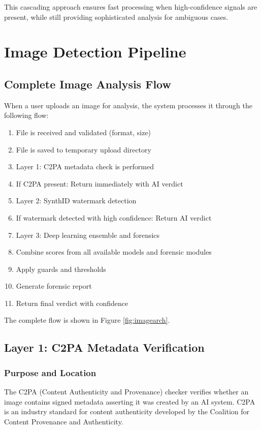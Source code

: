 \documentclass[12pt,a4paper]{book}
\begin{document}
This cascading approach ensures fast processing when high-confidence signals are present, while still providing sophisticated analysis for ambiguous cases.

\chapter{Image Detection Pipeline}
\label{ch:image-detection}

\section{Complete Image Analysis Flow}

When a user uploads an image for analysis, the system processes it through the following flow:

\begin{enumerate}
    \item File is received and validated (format, size)
    \item File is saved to temporary upload directory
    \item Layer 1: C2PA metadata check is performed
    \item If C2PA present: Return immediately with AI verdict
    \item Layer 2: SynthID watermark detection
    \item If watermark detected with high confidence: Return AI verdict
    \item Layer 3: Deep learning ensemble and forensics
    \item Combine scores from all available models and forensic modules
    \item Apply guards and thresholds
    \item Generate forensic report
    \item Return final verdict with confidence
\end{enumerate}

The complete flow is shown in Figure \ref{fig:imagearch}.

\section{Layer 1: C2PA Metadata Verification}
\label{sec:c2pa}

\subsection{Purpose and Location}
The C2PA (Content Authenticity and Provenance) checker verifies whether an image contains signed metadata asserting it was created by an AI system. C2PA is an industry standard for content authenticity developed by the Coalition for Content Provenance and Authenticity.
\end{document}
